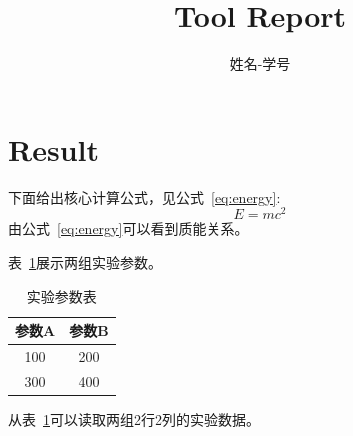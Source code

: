 \documentclass{article}
\begin{document}
	\title{Tool Report}
	\author{姓名-学号}
	\maketitle
	
	\section{Result}
	
	下面给出核心计算公式，见公式~\eqref{eq:energy}:
	\begin{equation}
		E = mc^2
		\label{eq:energy}
	\end{equation}
	由公式~\eqref{eq:energy}可以看到质能关系。
	
	表~\ref{tab:param}展示两组实验参数。
	\begin{table}[h]
		\centering
		\caption{实验参数表}
		\label{tab:param}
		\begin{tabular}{|c|c|}
			\hline
			参数A & 参数B \\
			\hline
			100 & 200 \\
			\hline
			300 & 400 \\
			\hline
		\end{tabular}
	\end{table}
	从表~\ref{tab:param}可以读取两组2行2列的实验数据。
	
\end{document}
